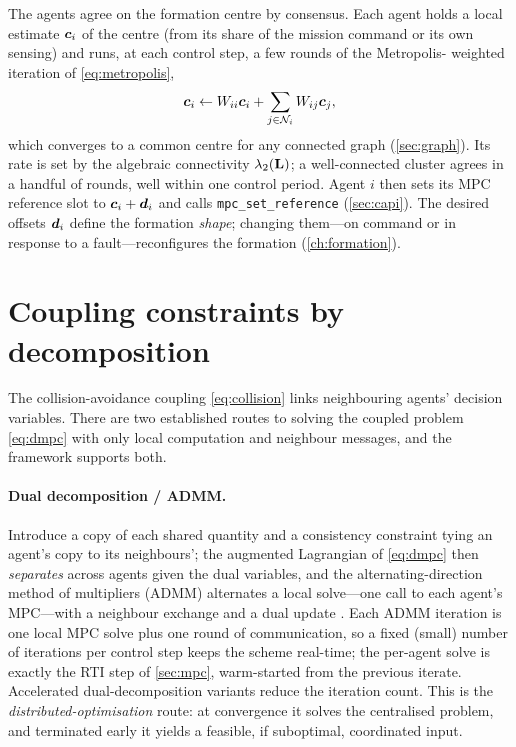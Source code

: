 The agents agree on the formation centre by consensus. Each agent holds a local
estimate $\bm{c}_i$ of the centre (from its share of the mission command or its
own sensing) and runs, at each control step, a few rounds of the Metropolis-%
weighted iteration of \cref{eq:metropolis},
\begin{equation}
\bm{c}_i\leftarrow W_{ii}\bm{c}_i+\sum_{j\in\mathcal{N}_i}W_{ij}\bm{c}_j,
\label{eq:centre-consensus}
\end{equation}
which converges to a common centre for any connected graph
(\cref{sec:graph}). Its rate is set by the algebraic connectivity
$\lambda_2(\mathbf{L})$; a well-connected cluster agrees in a handful of rounds, well
within one control period. Agent $i$ then sets its MPC reference slot to
$\bm{c}_i+\bm{d}_i$ and calls \texttt{mpc\_set\_reference}
(\cref{sec:capi}). The desired offsets $\bm{d}_i$ define the formation
\emph{shape}; changing them---on command or in response to a fault---reconfigures
the formation (\cref{ch:formation}).

\section{Coupling constraints by decomposition}

The collision-avoidance coupling \cref{eq:collision} links neighbouring agents'
decision variables. There are two established routes to solving the coupled
problem \cref{eq:dmpc} with only local computation and neighbour messages, and
the framework supports both.

\paragraph{Dual decomposition / ADMM.} Introduce a copy of each shared quantity
and a consistency constraint tying an agent's copy to its neighbours'; the
augmented Lagrangian of \cref{eq:dmpc} then \emph{separates} across agents given
the dual variables, and the alternating-direction method of multipliers (ADMM)
alternates a local solve---one call to each agent's MPC---with a neighbour
exchange and a dual update \cite{boyd2011admm,summers2012distributed}. Each ADMM
iteration is one local MPC solve plus one round of communication, so a fixed
(small) number of iterations per control step keeps the scheme real-time; the
per-agent solve is exactly the RTI step of \cref{sec:mpc}, warm-started from the
previous iterate. Accelerated dual-decomposition variants
\cite{giselsson2013accelerated} reduce the iteration count. This is the
\emph{distributed-optimisation} route: at convergence it solves the centralised
problem, and terminated early it yields a feasible, if suboptimal, coordinated
input.

